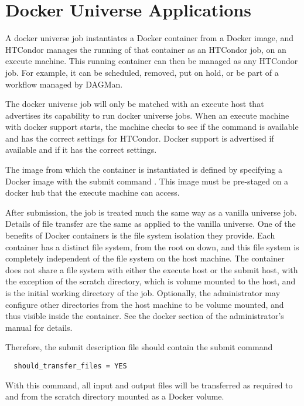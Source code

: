 \section{\label{sec:dockeruniverse}Docker Universe Applications}
A docker universe job instantiates a Docker container
from a Docker image, and HTCondor manages the running
of that container as an HTCondor job, on an execute machine.
This running container can then be managed as any HTCondor job.
For example, it can be scheduled, removed, put on hold, 
or be part of a workflow managed by DAGMan.

The docker universe job will only be matched with an execute host
that advertises its capability to run docker universe jobs.
When an execute machine with docker support starts, 
the machine checks to
see if the  command is available and has the correct
settings for HTCondor.  
Docker support is advertised if available and if it has the correct settings.

The image from which the container is instantiated is
defined by specifying a Docker image with the submit command
.  
This image must be pre-staged on a docker
hub that the execute machine can access.

After submission, the job is treated much the same way as a vanilla 
universe job.  
Details of file transfer are the same as applied to 
the vanilla universe.  
One of the benefits of Docker containers is 
the file system isolation they provide.  
Each container has a distinct file system, 
from the root on down, and this file
system is completely independent of the file system on the host machine.
The container does not share a file system with either the execute
host or the submit host, with the exception of the scratch directory,
which is volume mounted to the host, and is the initial working
directory of the job.  Optionally, the administrator may configure other
directories from the host machine to be volume mounted, and thus visible
inside the container.  See the docker section of the administrator's manual
for details.

Therefore,
the submit description file should contain the submit command
\begin{verbatim}
  should_transfer_files = YES
\end{verbatim}
With this command,  all input and output files will be transferred
as required to and from the scratch directory mounted as a
Docker volume.

